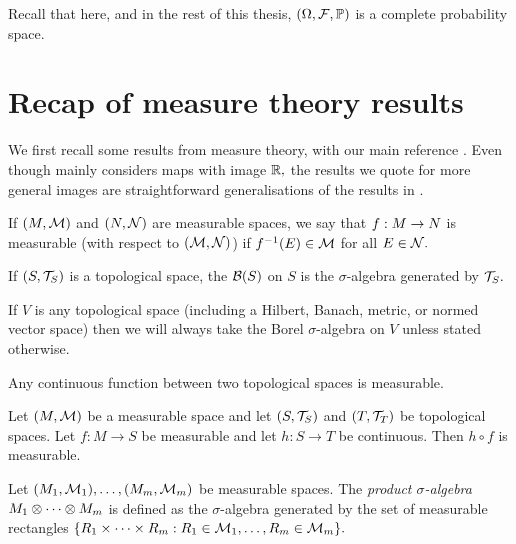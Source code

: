 Recall that here, and in the rest of this thesis, $\OFP$ is a complete probability space.

\section{Recap of measure theory results}

We first recall some results from measure theory, with our main reference \cite{Bo:07}. Even though \cite{Bo:07} mainly considers maps with image $\mathbb R,$ the results we quote for more general images are straightforward generalisations of the results in \cite{Bo:07}.

\begin{definition}\label{def:meas}
If $(M,\mathcal M)$ and $(N,\mathcal N)$ are measurable spaces, we say that $f:M\rightarrow N$ is measurable (with respect to $(\mathcal M,\mathcal N)$) if $f^{-1}(E) \in \mathcal M$ for all $E \in \mathcal N.$
\end{definition}



\label{def:borelsigma}
If $(S,\mathcal T_{S})$ is a topological space, the  $\Borel{S}$ on $S$ is the $\sigma$-algebra generated by $\mathcal T_{S}.$
\ede


If $V$ is any topological space (including a Hilbert, Banach, metric, or normed vector space) then we will always take the Borel $\sigma$-algebra on $V$ unless stated otherwise.


 \label{lem:contmeas}
Any continuous function between two topological spaces is measurable.
\ele





\label{lem:contplusmeas}
Let $(M,\mathcal M)$ be a measurable space and let $\mleft(S,\TS\mright)$ and $\mleft(T,\TopT\mright)$ be topological spaces. Let $f:M \rightarrow S$ be measurable and let $h : S \rightarrow T$ be continuous. Then $h \circ f$ is measurable.
\ele

\label{def:prodsigma}
Let $\mleft(\M_1,\FM_1\mright),\ldots,\mleft(\M_m,\FM_m\mright)$ be measurable spaces. The \emph{product $\sigma$-algebra} $M_1\otimes\cdots\otimes M_m$ is defined as the $\sigma$-algebra generated by the set of measurable rectangles
$%
\set{R_{1} \times \cdots \times R_m  \st R_{1} \in \FM_1, \ldots, R_m \in \FM_m}.
$
\ede

